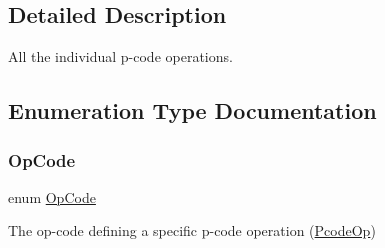 \subsection{Detailed Description}
All the individual p-\/code operations. 



\subsection{Enumeration Type Documentation}
\mbox{\label{opcodes_8hh_abeb7dfb0e9e2b3114e240a405d046ea7}} 
\subsubsection{\texorpdfstring{OpCode}{OpCode}}
{\footnotesize\ttfamily enum \mbox{\hyperlink{opcodes_8hh_abeb7dfb0e9e2b3114e240a405d046ea7}{Op\+Code}}}



The op-\/code defining a specific p-\/code operation (\mbox{\hyperlink{class_pcode_op}{Pcode\+Op}}) 

